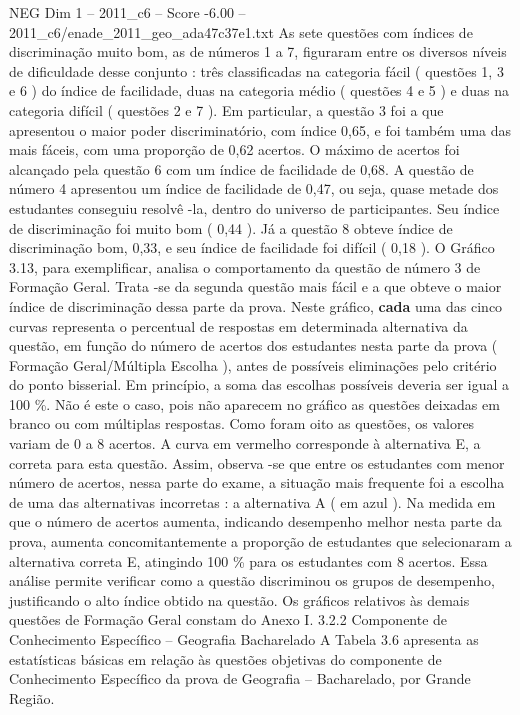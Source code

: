 \begin{textsample}{NEG Dim 1 – 2011\_c6 – Score -6.00 – 2011\_c6/enade\_2011\_geo\_ada47c37e1.txt}
As sete questões com índices de discriminação muito bom, as de números 1 a 7, figuraram entre os diversos níveis de dificuldade desse conjunto : três classificadas na categoria fácil ( questões 1, 3 e 6 ) do índice de facilidade, duas na categoria médio ( questões 4 e 5 ) e duas na categoria difícil ( questões 2 e 7 ).
Em particular, a questão 3 foi a que apresentou o maior poder discriminatório, com índice 0,65, e foi também uma das mais fáceis, com uma proporção de 0,62 acertos.
O máximo de acertos foi alcançado pela questão 6 com um índice de facilidade de 0,68.
A questão de número 4 apresentou um índice de facilidade de 0,47, ou seja, quase metade dos estudantes conseguiu resolvê -la, dentro do universo de participantes.
Seu índice de discriminação foi muito bom ( 0,44 ).
Já a questão 8 obteve índice de discriminação bom, 0,33, e seu índice de facilidade foi difícil ( 0,18 ).
O Gráfico 3.13, para exemplificar, analisa o comportamento da questão de número 3 de Formação Geral.
Trata -se da segunda questão mais fácil e a que obteve o maior índice de discriminação dessa parte da prova.
Neste gráfico, \textbf{cada} uma das cinco curvas representa o percentual de respostas em determinada alternativa da questão, em função do número de acertos dos estudantes nesta parte da prova ( Formação Geral/Múltipla Escolha ), antes de possíveis eliminações pelo critério do ponto bisserial.
Em princípio, a soma das escolhas possíveis deveria ser igual a 100 \%.
Não é este o caso, pois não aparecem no gráfico as questões deixadas em branco ou com múltiplas respostas.
Como foram oito as questões, os valores variam de 0 a 8 acertos.
A curva em vermelho corresponde à alternativa E, a correta para esta questão.
Assim, observa -se que entre os estudantes com menor número de acertos, nessa parte do exame, a situação mais frequente foi a escolha de uma das alternativas incorretas : a alternativa A ( em azul ).
Na medida em que o número de acertos aumenta, indicando desempenho melhor nesta parte da prova, aumenta concomitantemente a proporção de estudantes que selecionaram a alternativa correta E, atingindo 100 \% para os estudantes com 8 acertos.
Essa análise permite verificar como a questão discriminou os grupos de desempenho, justificando o alto índice obtido na questão.
Os gráficos relativos às demais questões de Formação Geral constam do Anexo I. 3.2.2 Componente de Conhecimento Específico – Geografia Bacharelado A Tabela 3.6 apresenta as estatísticas básicas em relação às questões objetivas do componente de Conhecimento Específico da prova de Geografia – Bacharelado, por Grande Região.

\end{textsample}
